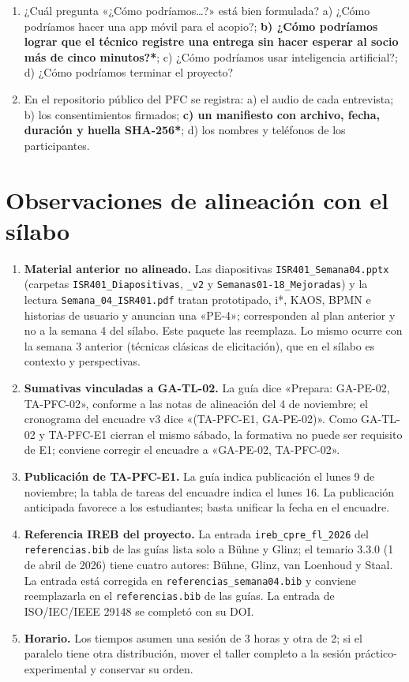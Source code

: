 \documentclass[11pt]{article}
\newcommand{\seccion}[1]{\section{\textcolor{utegreendk}{#1}}}
\begin{document}
\begin{enumerate}[leftmargin=20pt,itemsep=6pt]
	\item ¿Cuál pregunta «¿Cómo podríamos\ldots?» está bien formulada? a) ¿Cómo podríamos hacer una app móvil para el acopio?; \textbf{b) ¿Cómo podríamos lograr que el técnico registre una entrega sin hacer esperar al socio más de cinco minutos?*}; c) ¿Cómo podríamos usar inteligencia artificial?; d) ¿Cómo podríamos terminar el proyecto?
	\item En el repositorio público del PFC se registra: a) el audio de cada entrevista; b) los consentimientos firmados; \textbf{c) un manifiesto con archivo, fecha, duración y huella SHA-256*}; d) los nombres y teléfonos de los participantes.
\end{enumerate}

\seccion{Observaciones de alineación con el sílabo}

\begin{enumerate}[leftmargin=20pt,itemsep=4pt]
	\item \textbf{Material anterior no alineado.} Las diapositivas \texttt{ISR401\_\allowbreak{}Semana04.pptx} (carpetas \texttt{ISR401\_\allowbreak{}Diapositivas}, \texttt{\_\allowbreak{}v2} y \texttt{Semanas01-18\_\allowbreak{}Mejoradas}) y la lectura \texttt{Semana\_\allowbreak{}04\_\allowbreak{}ISR401.pdf} tratan prototipado, i*, KAOS, BPMN e historias de usuario y anuncian una «PE-4»; corresponden al plan anterior y no a la semana 4 del sílabo. Este paquete las reemplaza. Lo mismo ocurre con la semana 3 anterior (técnicas clásicas de elicitación), que en el sílabo es contexto y perspectivas.
	\item \textbf{Sumativas vinculadas a GA-TL-02.} La guía dice «Prepara: GA-PE-02, TA-PFC-02», conforme a las notas de alineación del 4 de noviembre; el cronograma del encuadre v3 dice «(TA-PFC-E1, GA-PE-02)». Como GA-TL-02 y TA-PFC-E1 cierran el mismo sábado, la formativa no puede ser requisito de E1; conviene corregir el encuadre a «GA-PE-02, TA-PFC-02».
	\item \textbf{Publicación de TA-PFC-E1.} La guía indica publicación el lunes 9 de noviembre; la tabla de tareas del encuadre indica el lunes 16. La publicación anticipada favorece a los estudiantes; basta unificar la fecha en el encuadre.
	\item \textbf{Referencia IREB del proyecto.} La entrada \texttt{ireb\_\allowbreak{}cpre\_\allowbreak{}fl\_\allowbreak{}2026} del \texttt{referencias.bib} de las guías lista solo a Bühne y Glinz; el temario 3.3.0 (1 de abril de 2026) tiene cuatro autores: Bühne, Glinz, van Loenhoud y Staal. La entrada está corregida en \texttt{referencias\_\allowbreak{}semana04.bib} y conviene reemplazarla en el \texttt{referencias.bib} de las guías. La entrada de ISO/IEC/IEEE 29148 se completó con su DOI.
	\item \textbf{Horario.} Los tiempos asumen una sesión de 3 horas y otra de 2; si el paralelo tiene otra distribución, mover el taller completo a la sesión práctico-experimental y conservar su orden.
\end{enumerate}

\nocite{iso29148_2018,ireb_cpre_fl_2026,bano_2019,pohl_2025}


\end{document}
